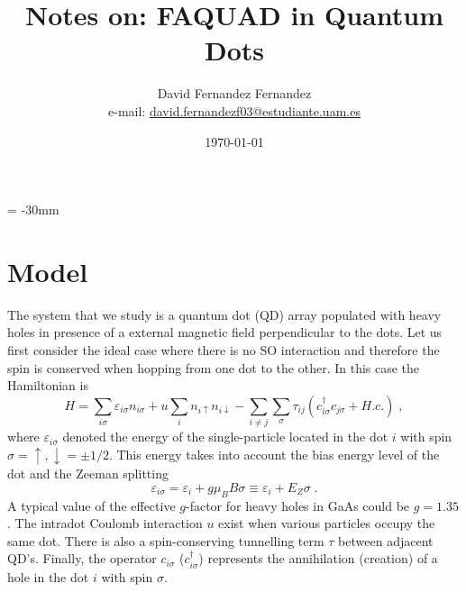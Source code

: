 \documentclass[a4paper,11pt]{article}
\begin{document}
   \droptitle = -30mm
   \title{Notes on: FAQUAD in Quantum Dots}

   \author{David Fernandez Fernandez \\ e-mail: \href{mailto:david.fernandezf03@estudiante.uam.es}{david.fernandezf03@estudiante.uam.es}}
   
   \date{\today}

   \maketitle
   
   \tableofcontents
    

\section{Model}

The system that we study is a quantum dot (QD) array populated with heavy holes in presence of a external magnetic field perpendicular to the dots. Let us first consider the ideal case where there is no SO interaction and therefore the spin is conserved when hopping from one dot to the other. In this case the Hamiltonian is
\begin{equation}
H=\sum_{i\sigma}\varepsilon_{i\sigma}n_{i\sigma}+u\sum_in_{i\uparrow}n_{i\downarrow}-\sum_{i\neq j}\sum_\sigma\tau_{ij}\left(c_{i\sigma}^\dagger c_{j\sigma}+H.c.\right)\; ,
\label{eq:Hubbard_model}
\end{equation}
where $\varepsilon_{i\sigma}$ denoted the energy of the single-particle located in the dot $i$ with spin $\sigma=\uparrow,\downarrow=\pm1/2$. This energy takes into account the bias energy level of the dot and the Zeeman splitting
\begin{equation}
\varepsilon_{i\sigma}=\varepsilon_i+g\mu_B B\sigma\equiv \varepsilon_i+E_Z\sigma\; .
\end{equation}
A typical value of the effective $g$-factor for heavy holes in GaAs could be $g=1.35$. The intradot Coulomb interaction $u$ exist when various particles occupy the same dot. There is also a spin-conserving tunnelling term $\tau$ between adjacent QD's. Finally, the operator $c_{i\sigma}$ ($c_{i\sigma}^{\dagger}$) represents the annihilation (creation) of a hole in the dot $i$ with spin $\sigma$.
\end{document}
